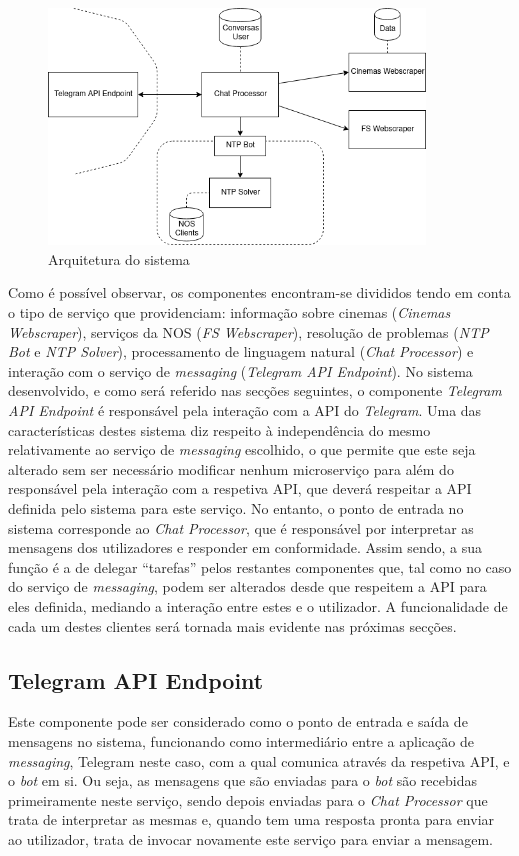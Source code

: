\documentclass[11pt,a4paper]{article}
\begin{document}
\begin{figure}[H]
    \centering
    \includegraphics[width=10cm]{images/arch.png}
    \caption{Arquitetura do sistema}
    \label{fig:arch}
\end{figure}

Como é possível observar, os componentes encontram-se divididos tendo em conta o tipo de serviço que
providenciam: informação sobre cinemas (\textit{Cinemas Webscraper}), serviços da NOS (\textit{FS Webscraper}), resolução
de problemas (\textit{NTP Bot} e \textit{NTP Solver}), processamento de linguagem natural (\textit{Chat
Processor}) e interação com o serviço de \textit{messaging} (\textit{Telegram API Endpoint}). No sistema
desenvolvido, e como será referido nas secções seguintes, o componente \textit{Telegram API Endpoint} é
responsável pela interação com a API do \textit{Telegram}. Uma das características destes sistema diz
respeito à independência do mesmo relativamente ao serviço de \textit{messaging} escolhido, o que permite
que este seja alterado sem ser necessário modificar nenhum microserviço para além do responsável pela
interação com a respetiva API, que deverá respeitar a API definida pelo sistema para este serviço. No
entanto, o ponto de entrada no sistema corresponde ao \textit{Chat Processor}, que é responsável por
interpretar as mensagens dos utilizadores e responder em conformidade. Assim sendo, a sua função é a de
delegar ``tarefas'' pelos restantes componentes que, tal como no caso do serviço de \textit{messaging},
podem ser alterados desde que respeitem a API para eles definida, mediando a interação entre estes e o
utilizador. A funcionalidade de cada um destes clientes será tornada mais evidente nas próximas secções.


\subsection{Telegram API Endpoint}
Este componente pode ser considerado como o ponto de entrada e saída de mensagens no sistema, funcionando
como intermediário entre a aplicação de \textit{messaging}, Telegram neste caso, com a qual comunica através
da respetiva API, e o \textit{bot} em si. Ou seja, as mensagens que são enviadas para o \textit{bot} são
recebidas primeiramente neste serviço, sendo depois enviadas para o \textit{Chat Processor} que trata de interpretar
as mesmas e, quando tem uma resposta pronta para enviar ao utilizador, trata de invocar novamente este
serviço para enviar a mensagem.
\end{document}
